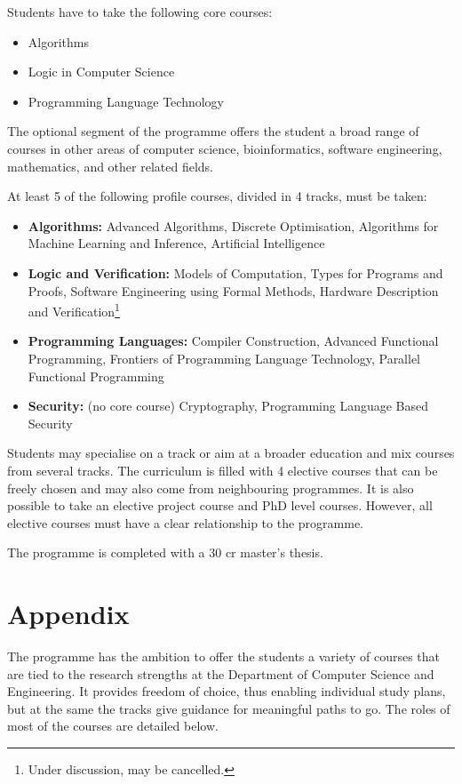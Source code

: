 \documentclass[twocolumn]{article}
\begin{document}
Students have to take the following core courses:
\begin{itemize}
\item Algorithms
\item Logic in Computer Science
\item Programming Language Technology
\end{itemize}

The optional segment of the programme offers the student a broad range
of courses in other areas of computer science, bioinformatics,
software engineering, mathematics, and other related fields.
 
At least 5 of the following profile courses, divided in 4 tracks, must
be taken:

\begin{itemize}
\item {\bf Algorithms:} Advanced Algorithms, Discrete Optimisation,
  Algorithms for Machine Learning and Inference, Artificial
  Intelligence
\item {\bf Logic and Verification:} Models of Computation, Types for
  Programs and Proofs, Software Engineering using Formal Methods,
  Hardware Description and Verification\footnote{Under discussion, may
    be cancelled.}
\item {\bf Programming Languages:} Compiler Construction, Advanced
  Functional Programming, Frontiers of Programming Language
  Technology, Parallel Functional Programming
\item {\bf Security:} (no core course) Cryptography, Programming
  Language Based Security
\end{itemize}

Students may specialise on a track or aim at a broader education and
mix courses from several tracks. The curriculum is filled with 4
elective courses that can be freely chosen and may also come from
neighbouring programmes. It is also possible to take an elective project
course and PhD level courses.  However, all elective courses must have
a clear relationship to the programme.

The programme is completed with a 30 cr master's thesis.

\newpage
\section*{Appendix}

The programme has the ambition to offer the students a variety of
courses that are tied to the research strengths at the Department of
Computer Science and Engineering. It provides freedom of choice, thus
enabling individual study plans, but at the same the tracks give
guidance for meaningful paths to go.  The roles of most of the courses
are detailed below.
\end{document}

